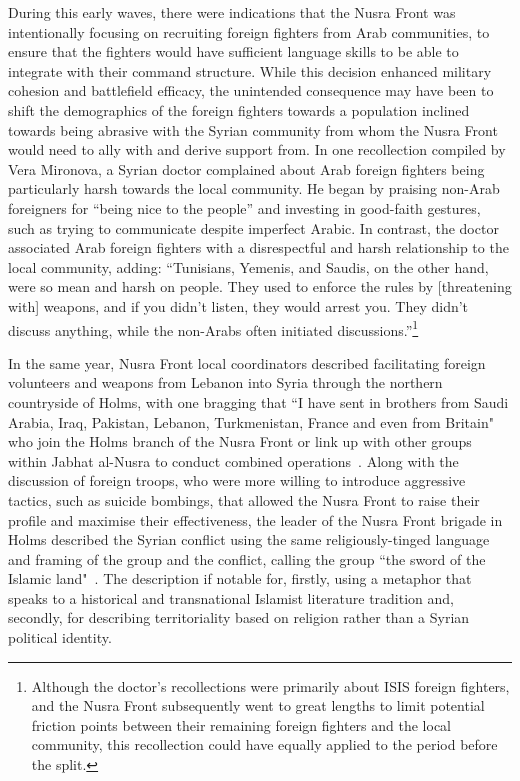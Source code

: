  
During this early waves, there were indications that the Nusra Front was intentionally focusing on recruiting foreign fighters from Arab communities, to ensure that the fighters would have sufficient language skills to be able to integrate with their command structure. While this decision enhanced military cohesion and battlefield efficacy, the unintended consequence may have been to shift the demographics of the foreign fighters towards a population inclined towards being abrasive with the Syrian community from whom the Nusra Front would need to ally with and derive support from. In one recollection compiled by Vera Mironova, a Syrian doctor complained about Arab foreign fighters being particularly harsh towards the local community.  He began by praising non-Arab foreigners for “being nice to the people” and investing in good-faith gestures, such as trying to communicate despite imperfect Arabic. In contrast, the doctor associated Arab foreign fighters with a disrespectful and harsh relationship to the local community, adding: “Tunisians, Yemenis, and Saudis, on the other hand, were so mean and harsh on people. They used to enforce the rules by [threatening with] weapons, and if you didn’t listen, they would arrest you. They didn’t discuss anything, while the non-Arabs often initiated discussions.”\footnote{Although the doctor’s recollections were primarily about ISIS foreign fighters, and the Nusra Front subsequently went to great lengths to limit potential friction points between their remaining foreign fighters and the local community, this recollection  could have equally applied to the period before the split.}~\autocite[159]{mironova} 


In the same year, Nusra Front local coordinators described facilitating foreign volunteers and weapons from Lebanon into Syria through the northern countryside of Holms, with one bragging that “I have sent in brothers from Saudi Arabia, Iraq, Pakistan, Lebanon, Turkmenistan, France and even from Britain" who join the Holms branch of the Nusra Front or link up with other groups within Jabhat al-Nusra to conduct combined operations~\autocite{sherlock2012inside}. Along with the discussion of foreign troops, who were more willing to introduce aggressive tactics, such as suicide bombings, that allowed the Nusra Front to raise their profile and maximise their effectiveness, the leader of the Nusra Front brigade in Holms described the Syrian conflict using the same religiously-tinged language and framing of the group and the conflict, calling the group “the sword of the Islamic land"~\autocite{sherlock2012inside}. The description if notable for, firstly, using a metaphor that speaks to a historical and transnational Islamist literature tradition and, secondly, for describing territoriality based on religion rather than a Syrian political identity. 

